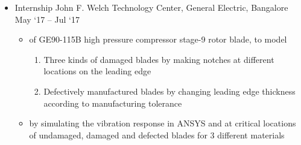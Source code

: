 \documentclass[a4paper,10pt]{article}
\newcommand{\apup}{AUSM\textsuperscript{+}-up}
\begin{document}
\begin{itemize}
\begin{itemize}
	\end{itemize}
	\item {}
	{Internship}
	{John F. Welch Technology Center, General Electric, Bangalore}
	{May `17 -- Jul `17}
	\begin{itemize}
	\item {} of GE90-115B high pressure compressor stage-9 rotor blade, to model
	\begin{enumerate}
		\item Three kinds of damaged blades by making notches at different locations on the leading edge
		\item Defectively manufactured blades by changing leading edge thickness according to manufacturing tolerance
	\end{enumerate}
	\item {} by simulating the vibration response in ANSYS and  at critical locations of undamaged, damaged and defected blades for 3 different materials
	\end{itemize}
\end{itemize}
\end{document}
